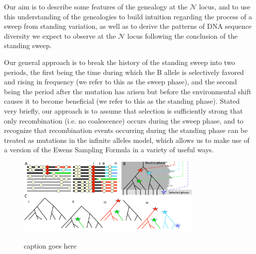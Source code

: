 \documentclass[a4paper,10pt]{article}
\newcommand{\fancyN}{$\mathcal N$ }
\newcommand{\fancyB}{$\mathcal B$ }
\newcommand{\jb}[1]{{\it\color{blue} (#1)} }
\begin{document}
Our aim is to describe some features of the genealogy at the \fancyN locus, and to use this understanding of the genealogies to build intuition regarding the process of a sweep from standing variation, as well as to derive the patterns of DNA sequence diversity we expect to observe at the \fancyN locus following the conclusion of the standing sweep.

Our general approach is to break the history of the standing sweep into two periods, the first being the time during which the B allele is selectively favored and rising in frequency (we refer to this as the sweep phase), and the second being the period after the mutation has arisen but before the environmental shift causes it to become beneficial (we refer to this as the standing phase). Stated very briefly, our approach is to assume that selection is sufficiently strong that only recombination (i.e. no coalescence) occurs during the sweep phase, and to recognize that recombination events occurring during the standing phase can be treated as mutations in the infinite alleles model, which allows us to make use of a version of the Ewens Sampling Formula in a variety of useful ways. %


\begin{figure}
	\includegraphics[width = 0.8\textwidth]{../Paper_Figures/Cartoon_of_soft_sweeps.pdf} \label{cartoon_fig_1}
	\caption{caption goes here}
\end{figure}
\end{document}
